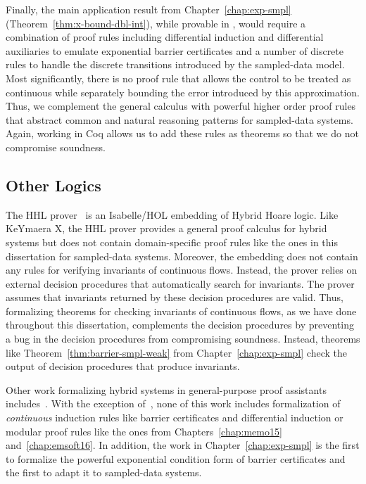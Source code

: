 Finally, the main application result from Chapter~\ref{chap:exp-smpl}
(Theorem~\ref{thm:x-bound-dbl-int}), while provable in \dL{}, would require
a combination of proof rules including differential induction and
differential auxiliaries to emulate exponential barrier certificates and a
number of discrete rules to handle the discrete transitions introduced by
the sampled-data model. Most significantly, there is no proof rule that
allows the control to be treated as continuous while separately bounding
the error introduced by this approximation. Thus, we complement the general
\dL{} calculus with powerful higher order proof rules that abstract common
and natural reasoning patterns for sampled-data systems. Again, working in
Coq allows us to add these rules as theorems so that we do not compromise
soundness.

\subsection{Other Logics}
\label{sec:related-logic-other}
The HHL prover~\cite{LiuHHL10,WangHHL2015} is an Isabelle/HOL embedding of
Hybrid Hoare logic. Like KeYmaera X, the HHL prover provides a general
proof calculus for hybrid systems but does not contain domain-specific
proof rules like the ones in this dissertation for sampled-data
systems. Moreover, the embedding does not contain any rules for verifying
invariants of continuous flows. Instead, the prover relies on external
decision procedures that automatically search for invariants. The prover
assumes that invariants returned by these decision procedures are
valid. Thus, formalizing theorems for checking invariants of continuous
flows, as we have done throughout this dissertation, complements the
decision procedures by preventing a bug in the decision procedures from
compromising soundness. Instead, theorems like
Theorem~\ref{thm:barrier-smpl-weak} from Chapter~\ref{chap:exp-smpl} check
the output of decision procedures that produce invariants.

Other work formalizing hybrid systems in general-purpose proof assistants
includes~\cite{volker2000towards,mumm-hybrid-pvs,Niqui2008,GeuversKSW10,Collins10ataylor,anand2015roscoq,arechigainvcuts15,Bohrer17-verified-dl}.
With the exception of~\cite{Bohrer17-verified-dl}, none of this work
includes formalization of \emph{continuous} induction rules like barrier
certificates and differential induction or modular proof rules like the
ones from Chapters~\ref{chap:memo15} and~\ref{chap:emsoft16}. In addition,
the work in Chapter~\ref{chap:exp-smpl} is the first to formalize the
powerful exponential condition form of barrier certificates and the first
to adapt it to sampled-data systems.

